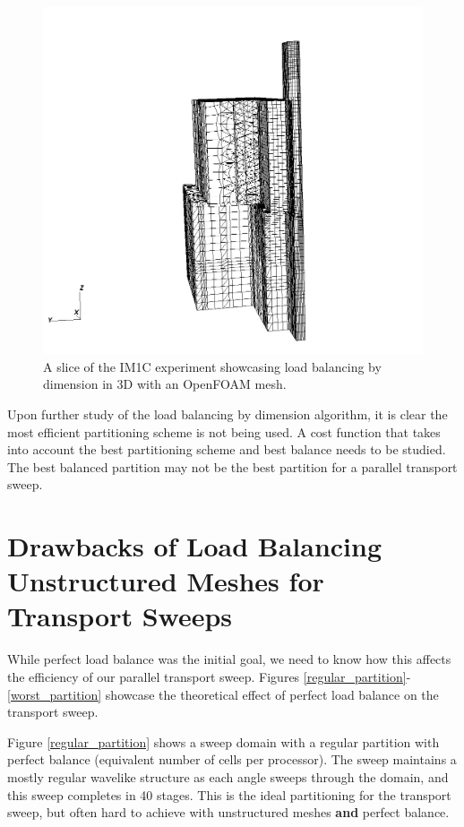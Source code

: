 \documentclass[11pt, letterpaper,titlepage,oneside]{article}
\begin{document}
\begin{figure}[H]
\centering
\includegraphics[scale=0.5]{../figures/im1_foam_448.png}
\caption{A slice of the IM1C experiment showcasing load balancing by dimension in 3D with an OpenFOAM mesh.}
\label{lbd}
\end{figure}

Upon further study of the load balancing by dimension algorithm, it is clear the most efficient partitioning scheme is not being used. A cost function that takes into account the best partitioning scheme and best balance needs to be studied. The best balanced partition may not be the best partition for a parallel transport sweep.


\section{Drawbacks of Load Balancing Unstructured Meshes for Transport Sweeps}

While perfect load balance was the initial goal, we need to know how this affects the efficiency of our parallel transport sweep. Figures \ref{regular_partition}-\ref{worst_partition} showcase the theoretical effect of perfect load balance on the transport sweep.

Figure \ref{regular_partition} shows a sweep domain with a regular partition with perfect balance (equivalent number of cells per processor). The sweep maintains a mostly regular wavelike structure as each angle sweeps through the domain, and this sweep completes in 40 stages. This is the ideal partitioning for the transport sweep, but often hard to achieve with unstructured meshes \textbf{and} perfect balance.
\end{document}
